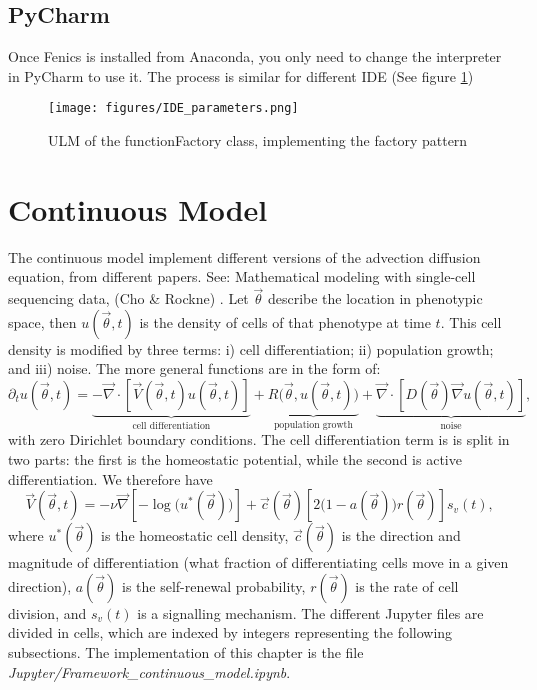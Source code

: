 \documentclass[11pt, oneside]{article}   	%
\newcommand{\vtheta}{\vec{\theta}}
\newcommand{\grad}{\vec{\nabla}}
\begin{document}
\subsection{PyCharm}
Once Fenics is installed from Anaconda, you only need to change the interpreter in PyCharm to use it. The process is similar for different IDE (See figure \ref{fig:IDE_parameters})

\begin{figure}[h]
\centering
\texttt{[image: figures/IDE\_parameters.png]}
\caption{ULM of the functionFactory class, implementing the factory pattern}
\label{fig:IDE_parameters}
\end{figure}

\section{Continuous Model}
The continuous model implement different versions of the advection diffusion equation, from different papers. 
See: Mathematical modeling with single-cell sequencing data, (Cho \& Rockne) \cite{cho:bioRxiv:2019}.
Let $\vtheta$ describe the location in phenotypic space, then $u(\vtheta,t)$ is the density of cells of that phenotype at time $t$.
This cell density is modified by three terms:
i) cell differentiation; ii) population growth; and iii) noise.
The more general functions are in the form of:
\begin{equation}
\partial_t u(\vtheta,t) =
\underbrace{-\grad \cdot \left[\vec{V}(\vtheta,t) u(\vtheta,t)\right]}_{\text{cell differentiation}} +
\underbrace{R\bigl(\vtheta, u(\vtheta,t)\bigr)}_{\text{population growth}} +
\underbrace{\grad \cdot \left[D(\vtheta) \grad u(\vtheta,t)\right]}_{\text{noise}},
\label{eq1}
\end{equation}
with zero Dirichlet boundary conditions.
The cell differentiation term is is split in two parts: the first is the homeostatic potential, while the second is active differentiation.
We therefore have
\begin{equation}
\vec{V}(\vtheta,t) =
- \nu \grad \left[-\log\bigl(u^*(\vtheta)\bigr)\right] +
\vec{c}(\vtheta) \left[2\bigl(1-a(\vtheta)\bigr)r(\vtheta)\right]s_v(t),
\end{equation}
where $u^*(\vtheta)$ is the homeostatic cell density, $\vec{c}(\vtheta)$ is the direction and magnitude of differentiation (what fraction of differentiating cells move in a given direction), $a(\vtheta)$ is the self-renewal probability, $r(\vtheta)$ is the rate of cell division, and $s_v(t)$ is a signalling mechanism.
\newline
\newline
The different Jupyter files are divided in cells, which are indexed by integers representing the following subsections. \newline
The implementation of this chapter is the file \textit{Jupyter/Framework\_continuous\_model.ipynb}.
\end{document}
